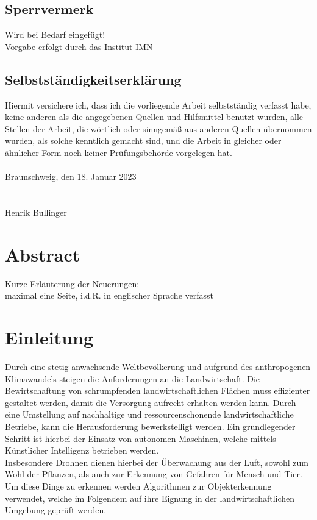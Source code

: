 \documentclass[12pt,
titlepage,
a4paper,
oneside,     %
openany,     %
listof=totoc,  %
numbers = noenddot, %
bibliography=totoc,    %
headsepline, %
]{scrbook} %
\title{\varTitel}
\date{\today}
\author{\varAuthor}
\begin{document}
\frontmatter
{}



\section*{Sperrvermerk}
Wird bei Bedarf eingefügt! \\
Vorgabe erfolgt durch das Institut IMN

\newpage
\section*{Selbstständigkeitserklärung}
Hiermit versichere ich, dass ich die vorliegende Arbeit selbstständig verfasst habe, keine anderen als die angegebenen Quellen und Hilfsmittel benutzt wurden, alle Stellen der Arbeit, die wörtlich oder sinngemäß aus anderen Quellen übernommen wurden, als solche kenntlich gemacht sind, und die Arbeit in gleicher oder ähnlicher Form noch keiner Prüfungsbehörde vorgelegen hat. \\
\\
Braunschweig, den 18. Januar 2023 \\
\\
\\
Henrik Bullinger \\



\listoffigures

\listoftables

\printacronyms

\newpage
\chapter*{Abstract}
Kurze Erläuterung der Neuerungen:\\
maximal eine Seite, i.d.R. in englischer Sprache verfasst

\newpage
\tableofcontents

\mainmatter
\chapter{Einleitung}
\label{cha:einleitung}

Durch eine stetig anwachsende Weltbevölkerung und aufgrund des anthropogenen Klimawandels steigen die Anforderungen an die Landwirtschaft. Die Bewirtschaftung von schrumpfenden landwirtschaftlichen Flächen muss effizienter gestaltet werden, damit die Versorgung aufrecht erhalten werden kann. Durch eine Umstellung auf nachhaltige und ressourcenschonende landwirtschaftliche Betriebe, kann die Herausforderung bewerkstelligt werden. Ein grundlegender Schritt ist hierbei der Einsatz von autonomen Maschinen, welche mittels Künstlicher Intelligenz betrieben werden. \\
Insbesondere Drohnen dienen hierbei der Überwachung aus der Luft, sowohl zum Wohl der Pflanzen, als auch zur Erkennung von Gefahren für Mensch und Tier. Um diese Dinge zu erkennen werden Algorithmen zur Objekterkennung verwendet, welche im Folgendem auf ihre Eignung in der landwirtschaftlichen Umgebung geprüft werden.
\end{document}
